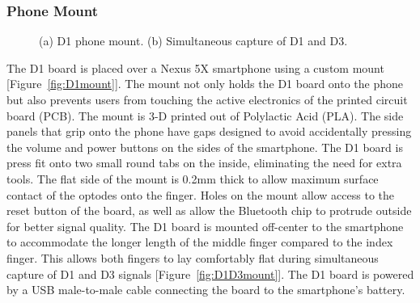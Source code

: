 \subsubsection{Phone Mount}
\begin{figure}
    \begin{center}
    \end{center}
    \caption{(a) D1 phone mount. (b) Simultaneous capture of D1 and D3.} 
    \label{fig:D1hardware}
\end{figure} 
The D1 board is placed over a Nexus 5X smartphone using a custom mount [Figure~\ref{fig:D1mount}]. The mount not only holds the D1 board onto the phone but also prevents users from touching the active electronics of the printed circuit board (PCB). The mount is 3-D printed out of Polylactic Acid (PLA). The side panels that grip onto the phone have gaps designed to avoid accidentally pressing the volume and power buttons on the sides of the smartphone. The D1 board is press fit onto two small round tabs on the inside, eliminating the need for extra tools. The flat side of the mount is 0.2mm thick to allow maximum surface contact of the optodes onto the finger. Holes on the mount allow access to the reset button of the board, as well as allow the Bluetooth chip to protrude outside for better signal quality. The D1 board is mounted off-center to the smartphone to accommodate the longer length of the middle finger compared to the index finger. This allows both fingers to lay comfortably flat during simultaneous capture of D1 and D3 signals [Figure~\ref{fig:D1D3mount}]. The D1 board is powered by a USB male-to-male cable connecting the board to the smartphone’s battery. 

